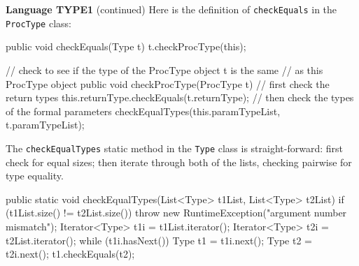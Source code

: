 \begin{minipage}[t]{\sw}
\slidenumber
\LARGE
{\bf Language TYPE1} (continued)\exx
\Large
Here is the definition of \verb'checkEquals' in the \verb'ProcType' class:
\large
\begin{qv}
public void checkEquals(Type t) {
    t.checkProcType(this);
}

// check to see if the type of the ProcType object t is the same
// as this ProcType object
public void checkProcType(ProcType t) {
    // first check the return types
    this.returnType.checkEquals(t.returnType);
    // then check the types of the formal parameters
    checkEqualTypes(this.paramTypeList, t.paramTypeList);
}
\end{qv}
\Large
The \verb'checkEqualTypes' static method
in the \verb'Type' class is straight-forward:
first check for equal sizes;
then iterate through both of the lists,
checking pairwise for type equality.
\large
\begin{qv}
public static void checkEqualTypes(List<Type> t1List, List<Type> t2List) {
    if (t1List.size() != t2List.size())
        throw new RuntimeException("argument number mismatch");
    Iterator<Type> t1i = t1List.iterator();
    Iterator<Type> t2i = t2List.iterator();
    while (t1i.hasNext()) {
        Type t1 = t1i.next();
        Type t2 = t2i.next();
        t1.checkEquals(t2);
    }
}
\end{qv}
\end{minipage}
